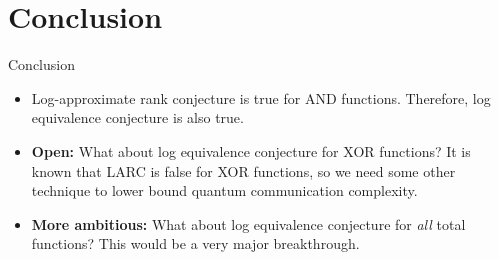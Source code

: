 \section{Conclusion}

\begin{frame}{Conclusion}
\begin{itemize}
	\item Log-approximate rank conjecture is true for AND functions. Therefore, log equivalence conjecture is also true.
	\item \textbf{Open: }What about log equivalence conjecture for XOR functions? It is known that LARC is false for XOR functions, so we need some other technique to lower bound quantum communication complexity.
	\item \textbf{More ambitious: }What about log equivalence conjecture for \textit{all} total functions? This would be a very major breakthrough.
\end{itemize}

\end{frame}